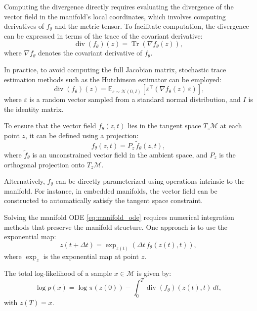 \documentclass[a4paper,14pt]{article}
\renewcommand{\epsilon}{\ensuremath{\varepsilon}}
\theoremstyle{plain} %
\theoremstyle{definition} %
\theoremstyle{remark} %
\begin{document}
	Computing the divergence directly requires evaluating the divergence of the vector field in the manifold's local coordinates, which involves computing derivatives of $f_\theta$ and the metric tensor. To facilitate computation, the divergence can be expressed in terms of the trace of the covariant derivative:
	\begin{equation}
		\operatorname{div}(f_\theta)(z) = \operatorname{Tr} \left( \nabla f_\theta(z) \right ),
		\label{eq:divergence_trace}
	\end{equation}
	where $\nabla f_\theta$ denotes the covariant derivative of $f_\theta$.
	
	In practice, to avoid computing the full Jacobian matrix, stochastic trace estimation methods such as the Hutchinson estimator can be employed:
	\begin{equation}
		\operatorname{div}(f_\theta)(z) = \mathbb{E}_{\epsilon \sim \mathcal{N}(0, I)} \left[ \epsilon^\top \left( \nabla f_\theta(z) \, \epsilon \right) \right],
		\label{eq:hutchinson_estimator}
	\end{equation}
	where $\epsilon$ is a random vector sampled from a standard normal distribution, and $I$ is the identity matrix.
	
	To ensure that the vector field $f_\theta(z, t)$ lies in the tangent space $T_z\mathcal{M}$ at each point $z$, it can be defined using a projection:
	\begin{equation}
		f_\theta(z, t) = P_z \, \tilde{f}_\theta(z, t),
		\label{eq:vector_field_projection}
	\end{equation}
	where $\tilde{f}_\theta$ is an unconstrained vector field in the ambient space, and $P_z$ is the orthogonal projection onto $T_z\mathcal{M}$.
	
	Alternatively, $f_\theta$ can be directly parameterized using operations intrinsic to the manifold. For instance, in embedded manifolds, the vector field can be constructed to automatically satisfy the tangent space constraint.
	
	Solving the manifold ODE \eqref{eq:manifold_ode} requires numerical integration methods that preserve the manifold structure. One approach is to use the exponential map:
	\begin{equation}
		z(t + \Delta t) = \exp_{z(t)} \left( \Delta t \, f_\theta(z(t), t) \right),
		\label{eq:exponential_map_update}
	\end{equation}
	where $\exp_{z}$ is the exponential map at point $z$.
	
	The total log-likelihood of a sample $x \in \mathcal{M}$ is given by:
	\begin{equation}
		\log p(x) = \log \pi(z(0)) - \int_0^T \operatorname{div}(f_\theta)(z(t), t) \, dt,
		\label{eq:log_likelihood}
	\end{equation}
	with $z(T) = x$.
	
\end{document}
